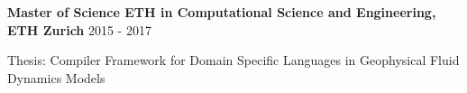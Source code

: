 \textbf{Master of Science ETH in Computational Science and Engineering, ETH Zurich} \hfill 2015 - 2017

Thesis: Compiler Framework for Domain Specific Languages in Geophysical Fluid Dynamics Models

